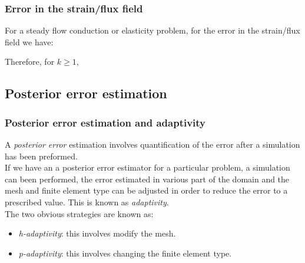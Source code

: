 \documentclass[notes]{beamer}
\begin{document}
\begin{frame}
\frametitle{Error in the strain/flux field}
For a steady flow conduction or elasticity problem, for the error in the strain/flux field we have:

Therefore, for $k \ge 1$,

\end{frame}

\subsection{Posterior error estimation}
\begin{frame}
\frametitle{Posterior error estimation and adaptivity}
A \textit{posterior error} estimation involves quantification of the error after a simulation has
been preformed.\\

If we have an a posterior error estimator for a particular problem, a simulation can
been performed, the error estimated in various part of the domain and the mesh and
finite element type can be adjusted in order to reduce the error to a prescribed value.
This is known as \textit{adaptivity}. \\

The two obvious strategies are known as:
	\begin{itemize}
		\item \textit{h-adaptivity}: this involves modify the mesh.
		\item \textit{p-adaptivity}: this involves changing the finite element type.
	\end{itemize}
\end{frame}
\end{document}
